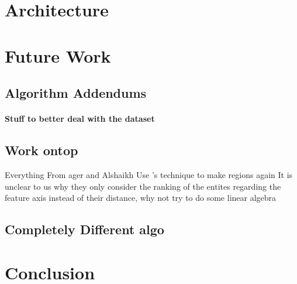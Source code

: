 



\section{Architecture}


\section{Future Work}
\label{sec:futurework}

\subsection*{Algorithm Addendums}
\todo

\paragraph{Stuff to better deal with the dataset}
\todo

\subsection*{Work ontop}
Everything From ager and Alshaikh
Use \cite{Erk2009}'s technique to make regions again
It is unclear to us why they only consider the ranking of the entites regarding the feature axis instead of their distance, why not try to do some linear algebra
\todo



\subsection*{Completely Different algo}
\todo





\section{Conclusion}

